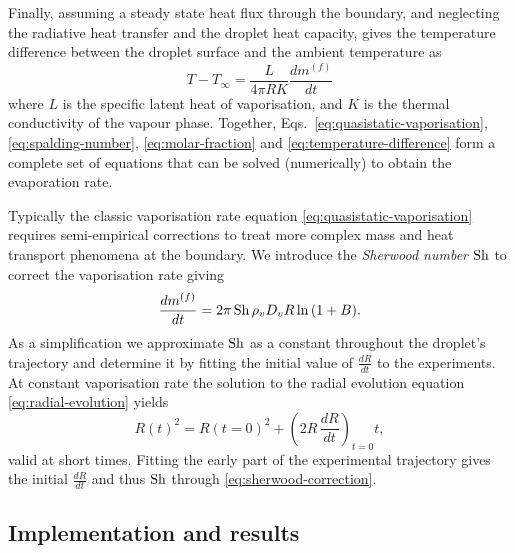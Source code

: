 \documentclass[11pt,twoside]{report}
\begin{document}
Finally, assuming a steady state heat flux through the boundary, and neglecting the radiative heat transfer and the droplet heat capacity, gives the temperature difference between the droplet surface and the ambient temperature as \cite{KulmalaJAS1992,RovelliJPCA2016}
\begin{equation}\label{eq:temperature-difference}
  T - T_\infty = \frac{L}{4\pi R K} \frac{dm^{(f)}}{dt}
\end{equation}
where $L$ is the specific latent heat of vaporisation, and $K$ is the thermal conductivity of the vapour phase.
Together, Eqs.\ \eqref{eq:quasistatic-vaporisation}, \eqref{eq:spalding-number}, \eqref{eq:molar-fraction} and \eqref{eq:temperature-difference} form a complete set of equations that can be solved (numerically) to obtain the evaporation rate.

Typically the classic vaporisation rate equation \eqref{eq:quasistatic-vaporisation} requires semi-empirical corrections to treat more complex mass and heat transport phenomena at the boundary.
We introduce the \emph{Sherwood number} $\mathrm{Sh}$ to correct the vaporisation rate giving
\begin{equation}\label{eq:sherwood-correction}
  \frac{dm^{(f)}}{dt}
  =
  2\pi \, \mathrm{Sh} \, \rho_v D_v R \ln{(1 + B)}.
\end{equation}
As a simplification we approximate $\mathrm{Sh}$ as a constant throughout the droplet's trajectory and determine it by fitting the initial value of $\tfrac{dR}{dt}$ to the experiments.
At constant vaporisation rate the solution to the radial evolution equation \eqref{eq:radial-evolution} yields
\begin{equation}
  R(t)^2
  =
  R(t=0)^2
  + \left(2R \, \frac{dR}{dt}\right)_{t=0} t,
\end{equation}
valid at short times.
Fitting the early part of the experimental trajectory gives the initial $\tfrac{dR}{dt}$ and thus $\mathrm{Sh}$ through \eqref{eq:sherwood-correction}.

\subsection{Implementation and results}
\end{document}
